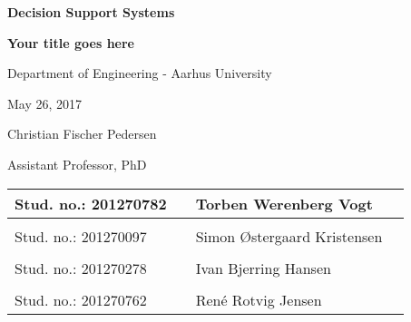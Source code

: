 
\centerline{\Huge\bfseries\color{ThemeColor} Decision Support Systems}

\vspace{1em}
\centerline{\Large\bfseries\color{BlackColor} Your title goes here}

\vspace{5em}
\centerline{\large\bfseries\color{BlackColor}}
\vspace{0.5em}
\centerline{\large\color{BlackColor}Department of Engineering - Aarhus University}

\vspace{0.5em}
\centerline{\large\color{BlackColor} May 26, 2017}

\vspace{5em}
\centerline{\large\color{BlackColor} Christian Fischer Pedersen}
\vspace{0.5em}
\centerline{\large\color{BlackColor} Assistant Professor, PhD}

\vspace{25em}

\begin{center}
   \begin{tabular}{ l p{3cm} l l }
    Stud. no.: 201270782 && Torben Werenberg Vogt & \\\hline
	& & \\
	Stud. no.: 201270097 && Simon Østergaard Kristensen & \\\hline
	& & \\
	Stud. no.: 201270278 && Ivan Bjerring Hansen & \\\hline
	& & \\
   Stud. no.: 201270762 && René Rotvig Jensen & \\\hline
   \end{tabular}
\end{center}
\thispagestyle{empty} %
\restoregeometry


